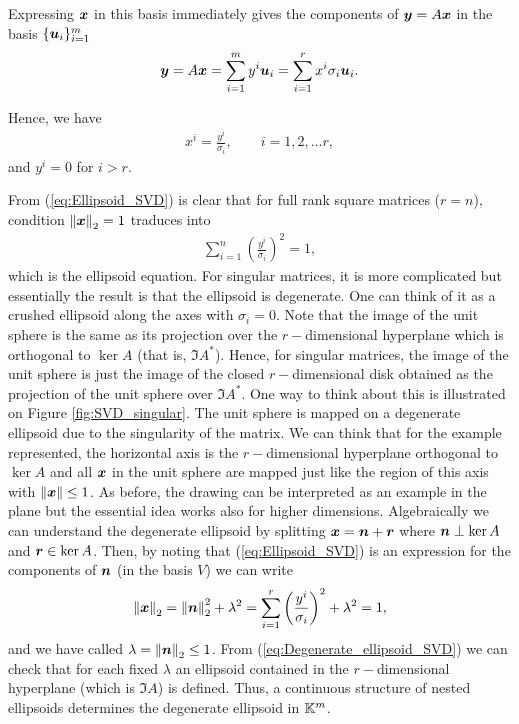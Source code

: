    Expressing $\boldsymbol{x}$ in this basis immediately gives the components of $\boldsymbol{y}=A\boldsymbol{x}$ in the basis $\{\boldsymbol{u}_i\}_{i=1}^{m}$
   \begin{align}
   	\boldsymbol{y} = A\boldsymbol{x} =\sum_{i=1}^{m} y^i \boldsymbol{u}_i = \sum_{i=1}^{r} x^i \sigma_i \boldsymbol{u}_i.
   \end{align}
   
   Hence, we have 
   \begin{align}
   	x^i = \frac{y^i}{\sigma_i}, \qquad i=1,2,\ldots r,
   	\label{eq:Ellipsoid_SVD}
   \end{align}
   and $y^i = 0$ for $i > r$. 
   
   From (\ref{eq:Ellipsoid_SVD}) is clear that for full rank square matrices ($r=n$), condition $\norm{\boldsymbol{x}}_2 = 1$ traduces into
   \begin{align}
   	\sum_{i=1}^{n} \left(\frac{y^i}{\sigma_i}\right)^2 = 1,
   \end{align}
   which is the ellipsoid equation. For singular matrices, it is more complicated but essentially the result is that the ellipsoid is 
   degenerate. One can think of it as a crushed ellipsoid along the axes with $\sigma_i = 0$. Note that the image of the unit sphere is the 
   same as its projection over the $r-$dimensional hyperplane which is orthogonal to $\ker A$ (that is, $\Im A^* $). Hence, for singular 
   matrices, the image of the unit sphere is just the image of the closed $r-$dimensional disk obtained as the projection of the unit sphere 
   over $\Im A^*$. One way to think about this is illustrated on Figure \ref{fig:SVD_singular}. The unit sphere is mapped on a degenerate 
   ellipsoid due to the singularity of the matrix. We can think that for the example represented, the horizontal axis is the $r-$dimensional 
   hyperplane orthogonal to $\ker A$ and all $\boldsymbol{x}$ in the unit sphere are mapped just like the region of this axis with 
   $\norm{\boldsymbol{x}}\leq1$. As before, the drawing can be interpreted as an example in the plane but the essential idea works also for higher 
   dimensions. Algebraically we can understand the degenerate ellipsoid by splitting $\boldsymbol{x} = \boldsymbol{n} + \boldsymbol{r}$ where $\boldsymbol{n} \perp 
   \ker A$ and $\boldsymbol{r}\in\ker A$. Then, by noting that (\ref{eq:Ellipsoid_SVD}) is an expression for the components of $	\boldsymbol{n} $ (in 
   the basis $V$) we can write
   \begin{align}
   	\norm{\boldsymbol{x}}_2 = \norm{	\boldsymbol{n} }_2^2 + \lambda^2 =  \sum_{i=1}^{r} \left(\frac{y^i}{\sigma_i}\right)^2 + \lambda^2 = 1 ,
   	\label{eq:Degenerate_ellipsoid_SVD}
   \end{align}
   and we have called $\lambda= \norm{	\boldsymbol{n} }_2\leq 1$. From (\ref{eq:Degenerate_ellipsoid_SVD}) we can check that for each fixed 
   $\lambda$ an ellipsoid contained in the $r-$dimensional hyperplane (which is $\Im A$) is defined. Thus, a continuous structure of nested 
   ellipsoids determines the degenerate ellipsoid in $\mathbb{K}^{m}$.  
   
